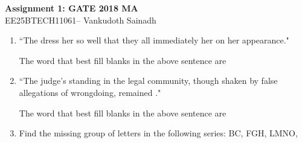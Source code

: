 \documentclass[journal,12pt,onecolumn]{IEEEtran}
\theoremstyle{remark}
\begin{document}
\begin{center}
\LARGE \textbf{Assignment 1: GATE 2018 MA}\\[2pt] 
\large EE25BTECH11061-- Vankudoth Sainadh
\end{center}

\begin{enumerate}
    \item ``The dress \underline{\hspace{2cm}} her so well that they all immediately \underline{\hspace{2cm}} her on her appearance." 
    
    \hfill{}
    
    The word that best fill blanks in the above sentence are
    \begin{enumerate}
    \end{enumerate}

    \item ``The judge's standing in the legal community, though shaken by false allegations of wrongdoing, remained \underline{\hspace{2cm}}."
    
    \hfill{} 
   
    The word that best fill blanks in the above sentence are
    \begin{enumerate}
    \end{enumerate}

\item Find the missing group of letters in the following series: BC, FGH, LMNO, \underline{\hspace{2cm}} \\ 
\begin{enumerate}
\end{enumerate}


\end{enumerate}
\end{document}

